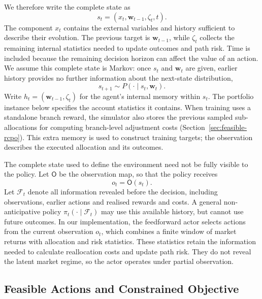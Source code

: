 \documentclass[10pt]{article}
\begin{document}
We therefore write the complete state as
\begin{equation}
  s_t=(x_t,\bm w_{t-1},\zeta_t,t).
  \label{eq:augmented-state}
\end{equation}
The component $x_t$ contains the external variables and history sufficient to describe their evolution. The previous target is $\bm w_{t-1}$, while $\zeta_t$ collects the remaining internal statistics needed to update outcomes and path risk. Time is included because the remaining decision horizon can affect the value of an action. We assume this complete state is Markov: once $s_t$ and $\bm w_t$ are given, earlier history provides no further information about the next-state distribution,
\begin{equation}
  s_{t+1}\sim P(\cdot\mid s_t,\bm w_t).
  \label{eq:allocation-transition}
\end{equation}
Write $h_t=(\bm w_{t-1},\zeta_t)$ for the agent's internal memory within $s_t$. The portfolio instance below specifies the account statistics it contains. When training uses a standalone branch reward, the simulator also stores the previous sampled sub-allocations for computing branch-level adjustment costs (Section~\ref{sec:feasible-rcpo}). This extra memory is used to construct training targets; the observation describes the executed allocation and its outcomes.

The complete state used to define the environment need not be fully visible to the policy. Let $\mathsf O$ be the observation map, so that the policy receives
\begin{equation}
  o_t=\mathsf O(s_t).
  \label{eq:allocation-observation}
\end{equation}
Let $\mathcal F_t$ denote all information revealed before the decision, including observations, earlier actions and realised rewards and costs. A general non-anticipative policy $\pi_t(\cdot\mid\mathcal F_t)$ may use this available history, but cannot use future outcomes. In our implementation, the feedforward actor selects actions from the current observation \(o_t\), which combines a finite window of market returns with allocation and risk statistics. These statistics retain the information needed to calculate reallocation costs and update path risk. They do not reveal the latent market regime, so the actor operates under partial observation.

\subsection{Feasible Actions and Constrained Objective}
\end{document}
